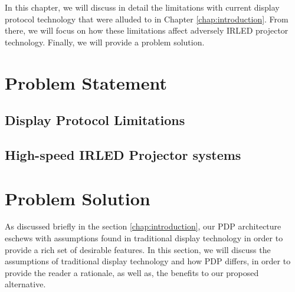 \label{chap:problem_formulation}

 In this chapter, we will discuss in detail the limitations with current display protocol technology that were alluded to in Chapter \ref{chap:introduction}. From there, we will focus on how these limitations affect adversely IRLED projector technology. Finally, we will provide a problem solution.

\section{Problem Statement}

\subsection{Display Protocol Limitations}

\subsection{High-speed IRLED Projector systems}

\section{Problem Solution}

As discussed briefly in the section \ref{chap:introduction}, our PDP architecture eschews with assumptions found in traditional display technology in order to provide a rich set of desirable features. In this section, we will discuss the assumptions of traditional display technology and how PDP differs, in order to provide the reader a rationale, as well as, the benefits to our proposed alternative.

